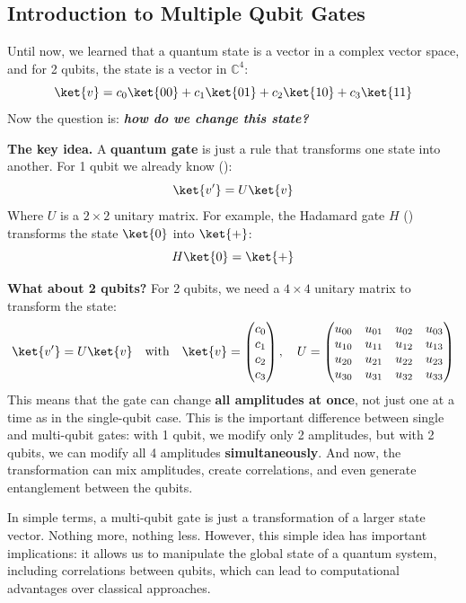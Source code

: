 \subsection{Introduction to Multiple Qubit Gates}

Until now, we learned that a quantum state is a vector in a complex vector space, and for 2 qubits, the state is a vector in $ \mathbb{C}^{4} $:
\begin{equation*}
    \ket{v} = c_{0} \ket{00} + c_{1} \ket{01} + c_{2} \ket{10} + c_{3} \ket{11}
\end{equation*}
Now the question is: \emph{\textbf{how do we change this state?}}

\highspace
\textcolor{Green3}{ \textbf{The key idea.}} A \textbf{quantum gate} is just a rule that transforms one state into another. For 1 qubit we already know ():
\begin{equation*}
    \ket{v'} = U \ket{v}
\end{equation*}
Where $ U $ is a $2 \times 2 $ unitary matrix. For example, the Hadamard gate $ H $ () transforms the state $ \ket{0} $ into $ \ket{+} $:
\begin{equation*}
    H \ket{0} = \ket{+}
\end{equation*}

\highspace
\textcolor{Green3}{ \textbf{What about 2 qubits?}} For 2 qubits, we need a $4 \times 4$ unitary matrix to transform the state:
\begin{equation*}
    \ket{v'} = U \ket{v} \quad \text{with} \quad \ket{v} = \begin{pmatrix}
        c_{0} \\ c_{1} \\ c_{2} \\ c_{3}
    \end{pmatrix}, \quad U = \begin{pmatrix}
        u_{00} & u_{01} & u_{02} & u_{03} \\
        u_{10} & u_{11} & u_{12} & u_{13} \\
        u_{20} & u_{21} & u_{22} & u_{23} \\
        u_{30} & u_{31} & u_{32} & u_{33}
    \end{pmatrix}
\end{equation*}
This means that the gate can change \textbf{all amplitudes at once}, not just one at a time as in the single-qubit case. This is the important difference between single and multi-qubit gates: with 1 qubit, we modify only 2 amplitudes, but with 2 qubits, we can modify all 4 amplitudes \textbf{simultaneously}. And now, the transformation can mix amplitudes, create correlations, and even generate entanglement between the qubits.

\highspace
In simple terms, a multi-qubit gate is just a transformation of a larger state vector. Nothing more, nothing less. However, this simple idea has important implications: it allows us to manipulate the global state of a quantum system, including correlations between qubits, which can lead to computational advantages over classical approaches.